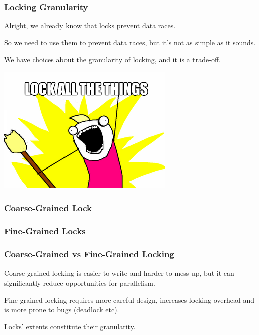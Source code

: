 \begin{frame}
\frametitle{Locking Granularity}
Alright, we already know that locks prevent data races.

So we need to use them to prevent data races, but it's not as simple as it sounds. 

We have choices about the granularity of locking, and it is a trade-off.


\end{frame}

\begin{frame}

  \begin{center}
    \includegraphics[scale=0.5]{images/lock-all-the-things}
  \end{center}
\end{frame}

\begin{frame}
\frametitle{Coarse-Grained Lock}

  \begin{center}
    
  \end{center}

\end{frame}

\begin{frame}
\frametitle{Fine-Grained Locks}

  \begin{center}
    
  \end{center}

\end{frame}

\begin{frame}
\frametitle{Coarse-Grained vs Fine-Grained Locking}

\alert{Coarse-grained} locking is easier to write and harder to mess up, but it can significantly reduce opportunities for parallelism. 

\alert{Fine-grained locking} requires more careful design,
increases locking overhead and is more prone to bugs (deadlock etc).  


Locks' extents constitute their granularity. 

\end{frame}


